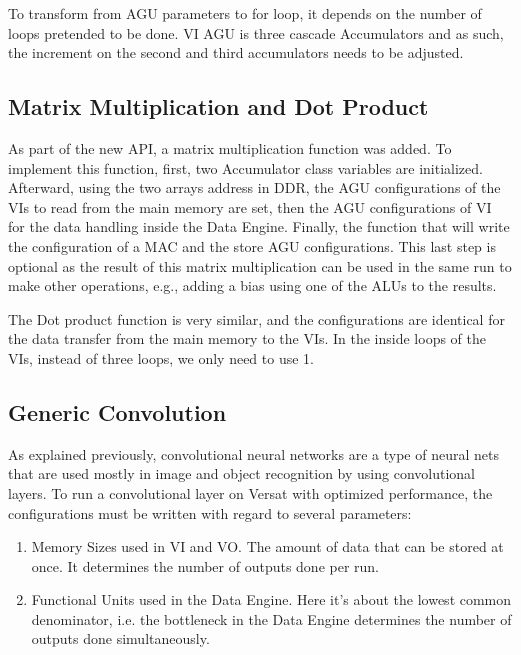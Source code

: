 \documentclass[conference]{IEEEtran}
\begin{document}
To transform from AGU parameters to for loop, it depends on the number of loops pretended to be done. VI AGU is three  cascade Accumulators
and as such, the increment on the second and third accumulators needs to be adjusted.

% 

\subsection{Matrix Multiplication and Dot Product}

As part of the new API, a matrix multiplication function was added. To implement this function, first, two Accumulator class variables are initialized.
Afterward, using the two arrays address in DDR, the AGU configurations of the VIs to read from the main memory are set, then the AGU configurations of VI for the data handling inside the Data Engine.
Finally, the function that will write the configuration of a MAC and the store AGU configurations. This last step is optional as the result of this matrix multiplication can be used in the same run
to make other operations, e.g., adding a bias using one of the ALUs to the results.

% 

The Dot product function is very similar, and the configurations are identical for the data transfer from the main memory to the VIs. In the inside loops of the VIs, instead of three  loops, we only need to use 
1.

\subsection{Generic Convolution}

As explained previously, convolutional neural networks are a type of neural nets that are 
used mostly in image and object recognition by using convolutional layers. To run a convolutional layer on Versat with
optimized performance, the configurations must be written with regard to several parameters:

\begin{enumerate}
	\item Memory Sizes used in VI and VO. The amount of data that can be stored at once. It determines the number of outputs done per run.
	\item Functional Units used in the Data Engine. Here it's about the lowest common denominator, i.e. the bottleneck in the Data Engine determines the number of outputs done simultaneously.
  \end{enumerate}
 
\end{document}
